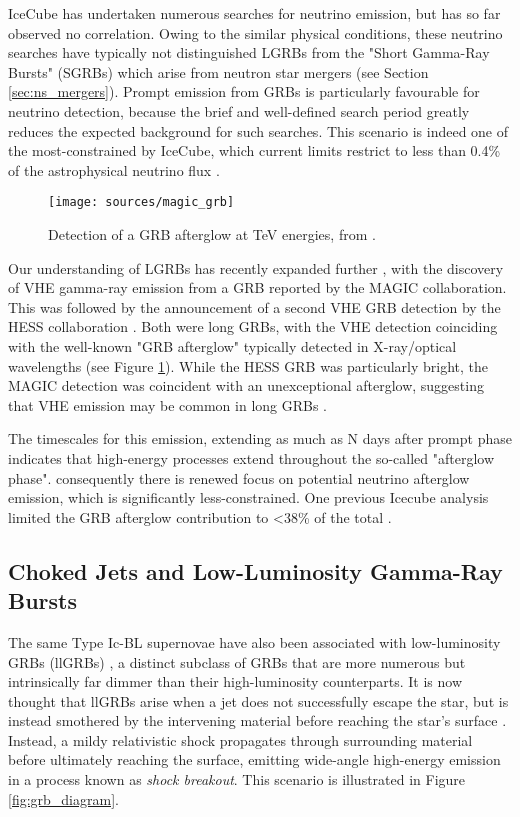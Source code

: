 IceCube has undertaken numerous searches for neutrino emission, but has so far observed no correlation. Owing to the similar physical conditions, these neutrino searches have typically not distinguished LGRBs from the "Short Gamma-Ray Bursts" (SGRBs) which arise from neutron star mergers (see Section \ref{sec:ns_mergers}). Prompt emission from GRBs is particularly favourable for neutrino detection, because the brief and well-defined search period greatly reduces the expected background for such searches. This scenario is indeed one of the most-constrained by IceCube, which current limits restrict to less than 0.4\% of the astrophysical neutrino flux . 

\begin{figure}[!ht]
	\centering \texttt{[image: sources/magic\_grb]}
	\caption{Detection of a GRB afterglow at TeV energies, from \cite{magic_grb_19}.}
	\label{fig:magic_grb}
\end{figure}

Our understanding of LGRBs has recently expanded further , with the discovery of VHE gamma-ray emission from a GRB reported by the MAGIC collaboration. This was followed by the announcement of a second VHE GRB detection by the HESS collaboration . Both were long GRBs, with the VHE detection coinciding with the well-known "GRB afterglow" typically detected in X-ray/optical wavelengths (see Figure \ref{fig:magic_grb}). While the HESS GRB was particularly bright, the MAGIC detection was coincident with an unexceptional afterglow, suggesting that VHE emission may be common in long GRBs .

The timescales for this emission, extending as much as N days after prompt phase indicates that high-energy processes extend throughout the so-called "afterglow phase". consequently there is renewed focus on potential neutrino afterglow  emission, which is significantly less-constrained. One previous Icecube analysis limited the GRB afterglow  contribution to <38\% of the total .

\subsection{Choked Jets and Low-Luminosity Gamma-Ray Bursts}

The same Type Ic-BL supernovae have also been associated with low-luminosity GRBs (llGRBs)  , a distinct subclass of GRBs that are more numerous but intrinsically far dimmer than their high-luminosity counterparts. It is now thought that llGRBs arise when a jet does not successfully escape the star, but is instead smothered by the intervening material before reaching the star's surface . Instead, a mildy relativistic shock propagates through surrounding material before ultimately reaching the surface, emitting wide-angle high-energy emission in a process known as \emph{shock breakout}. This scenario is illustrated in Figure \ref{fig:grb_diagram}.

